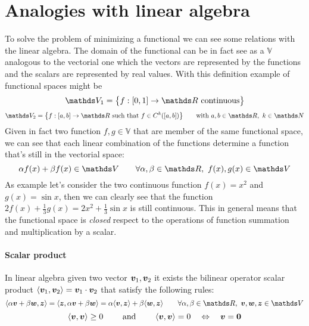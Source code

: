 \section{Analogies with linear algebra}
	To solve the problem of minimizing a functional we can see some relations with the linear algebra. The domain of the functional can be in fact see as a  $\mathds V$ analogous to the vectorial one which the vectors are represented by the functions and the scalars are represented by real values. With this definition example of functional spaces might be
	\[ \mathds V_1 = \big\{ f : [0,1] \rightarrow \R \textrm{ continuous}\big\} \]
	\[ \mathds V_2 = \big\{ f: [a,b]\rightarrow \R \textrm{ such that } f\in C^k([a,b]) \big\} \qquad \textrm{with } a,b \in \R, \ k\in \mathds N \]
	Given in fact two function $f,g \in \mathds V$ that are member of the same functional space, we can see that each linear combination of the functions determine a function that's still in the vectorial space:
	\[ \alpha f(x) + \beta f(x) \in \mathds V \qquad \forall \alpha,\beta \in \R, \ f(x),g(x) \in \mathds V \]
	As example let's consider the two continuous function $f(x) = x^2$ and $g(x) = \sin x$, then we can clearly see that the function $2f(x) + \frac 13 g(x) = 2x^2 +\frac 13\sin x$ is still continuous. This in general means that the functional space is \textit{closed} respect to the operations of function summation and multiplication by a scalar.
	
	\paragraph{Scalar product} In linear algebra given two vector $\boldsymbol{v}_1, \boldsymbol{v}_2$ it exists the bilinear operator scalar product $\langle \boldsymbol{v}_1,\boldsymbol{v}_2 \rangle = \boldsymbol{v}_1 \cdot \boldsymbol{v}_2$  that satisfy the following rules:
	\[ \langle \alpha \vett v + \beta \vett w, \vett z\rangle = \langle \vett z , \alpha \vett v + \beta \vett w\rangle = \alpha \langle \vett v,\vett z\rangle + \beta \langle \vett w,\vett z\rangle \qquad \forall \alpha,\beta \in \R, \ \vett v,\vett w,\vett z \in \mathds V \]	
	\[ \langle \boldsymbol{v},\boldsymbol{v}\rangle \geq 0 \qquad \textrm{ and } \qquad \langle \boldsymbol{v},\boldsymbol{v} \rangle = 0 \quad \Leftrightarrow \quad \boldsymbol{v} = \boldsymbol{0} \]
	
